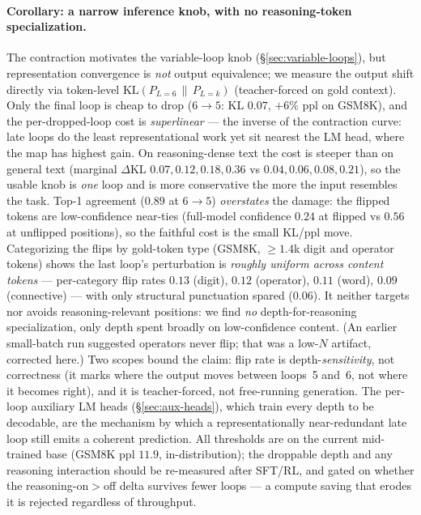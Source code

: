 \paragraph{Corollary: a narrow inference knob, with no reasoning-token
specialization.} The contraction motivates the variable-loop knob
(\S\ref{sec:variable-loops}), but representation convergence is \emph{not}
output equivalence; we measure the output shift directly via token-level
$\mathrm{KL}\!\left(P_{L=6}\,\|\,P_{L=k}\right)$ (teacher-forced on gold context).
Only the final loop is cheap to drop ($6\!\to\!5$: KL $0.07$, $+6\%$ ppl on
GSM8K), and the per-dropped-loop cost is \emph{superlinear} --- the inverse of
the contraction curve: late loops do the least representational work yet sit
nearest the LM head, where the map has highest gain. On reasoning-dense text the
cost is steeper than on general text (marginal $\Delta$KL
$0.07,0.12,0.18,0.36$ vs $0.04,0.06,0.08,0.21$), so the usable knob is
\emph{one} loop and is more conservative the more the input resembles the task.
Top-1 agreement ($0.89$ at $6\!\to\!5$) \emph{overstates} the damage: the flipped
tokens are low-confidence near-ties (full-model confidence $0.24$ at flipped vs
$0.56$ at unflipped positions), so the faithful cost is the small KL/ppl move.
Categorizing the flips by gold-token type (GSM8K, $\geq\!1.4$k digit and operator
tokens) shows the last loop's perturbation is \emph{roughly uniform across
content tokens} --- per-category flip rates $0.13$ (digit), $0.12$ (operator),
$0.11$ (word), $0.09$ (connective) --- with only structural punctuation spared
($0.06$). It neither targets nor avoids reasoning-relevant positions: we find
\emph{no} depth-for-reasoning specialization, only depth spent broadly on
low-confidence content. (An earlier small-batch run suggested operators never
flip; that was a low-$N$ artifact, corrected here.) Two scopes bound the claim:
flip rate is depth-\emph{sensitivity}, not correctness (it marks where the output
moves between loops~5 and~6, not where it becomes right), and it is teacher-forced,
not free-running generation. The per-loop auxiliary LM heads
(\S\ref{sec:aux-heads}), which train every depth to be decodable, are the
mechanism by which a representationally near-redundant late loop still emits a
coherent prediction. All thresholds are on the current mid-trained base (GSM8K
ppl $11.9$, in-distribution); the droppable depth and any reasoning interaction
should be re-measured after SFT/RL, and gated on whether the reasoning-on$>$off
delta survives fewer loops --- a compute saving that erodes it is rejected
regardless of throughput.

